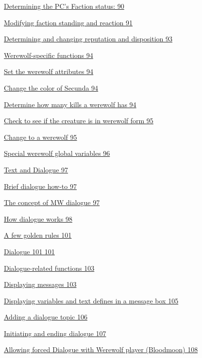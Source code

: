 \documentclass[
]{article}
\begin{document}
\protect\hyperlink{determining-the-pcs-faction-status}{Determining the
PC's Faction status: 90}

\protect\hyperlink{modifying-faction-standing-and-reaction}{Modifying
faction standing and reaction 91}

\protect\hyperlink{determining-and-changing-reputation-and-disposition}{Determining
and changing reputation and disposition 93}

\protect\hyperlink{werewolf-specific-functions}{Werewolf-specific
functions 94}

\protect\hyperlink{set-the-werewolf-attributes}{Set the werewolf
attributes 94}

\protect\hyperlink{change-the-color-of-secunda}{Change the color of
Secunda 94}

\protect\hyperlink{determine-how-many-kills-a-werewolf-has}{Determine
how many kills a werewolf has 94}

\protect\hyperlink{check-to-see-if-the-creature-is-in-werewolf-form}{Check
to see if the creature is in werewolf form 95}

\protect\hyperlink{change-to-a-werewolf}{Change to a werewolf 95}

\protect\hyperlink{section-8}{Special werewolf global variables 96}

\protect\hyperlink{text-and-dialogue}{Text and Dialogue 97}

\protect\hyperlink{brief-dialogue-how-to}{Brief dialogue how-to 97}

\protect\hyperlink{the-concept-of-mw-dialogue}{The concept of MW
dialogue 97}

\protect\hyperlink{how-dialogue-works}{How dialogue works 98}

\protect\hyperlink{a-few-golden-rules}{A few golden rules 101}

\protect\hyperlink{dialogue-101}{Dialogue 101 101}

\protect\hyperlink{dialogue-related-functions}{Dialogue-related
functions 103}

\protect\hyperlink{displaying-messages}{Displaying messages 103}

\protect\hyperlink{_Toc182634588}{Displaying variables and text defines
in a message box 105}

\protect\hyperlink{adding-a-dialogue-topic}{Adding a dialogue topic 106}

\protect\hyperlink{initiating-and-ending-dialogue}{Initiating and ending
dialogue 107}

\protect\hyperlink{allowing-forced-dialogue-with-werewolf-player-bloodmoon}{Allowing
forced Dialogue with Werewolf player (Bloodmoon) 108}
\end{document}
